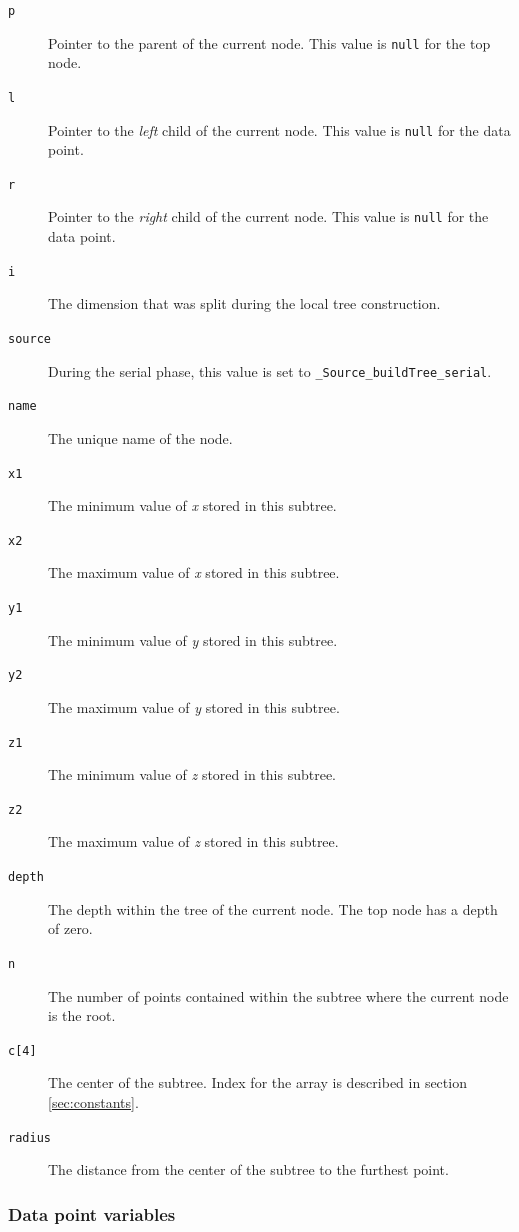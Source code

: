 \documentclass{article}
\begin{document}
\begin{description}
    \item[\texttt{p}]{Pointer to the parent of the current node. This value is \texttt{null} for the top node.}
    \item[\texttt{l}]{Pointer to the \textit{left} child of the current node. This value is \texttt{null} for the data point.}
    \item[\texttt{r}]{Pointer to the \textit{right} child of the current node. This value is \texttt{null} for the data point.}
    \item[\texttt{i}]{The dimension that was split during the local tree construction.}
    \item[\texttt{source}]{During the serial phase, this value is set to \texttt{\_Source\_buildTree\_serial}.}
    \item[\texttt{name}]{The unique name of the node.}
    \item[\texttt{x1}]{The minimum value of \textit{x} stored in this subtree.}
    \item[\texttt{x2}]{The maximum value of \textit{x} stored in this subtree.}
    \item[\texttt{y1}]{The minimum value of \textit{y} stored in this subtree.}
    \item[\texttt{y2}]{The maximum value of \textit{y} stored in this subtree.}
    \item[\texttt{z1}]{The minimum value of \textit{z} stored in this subtree.}
    \item[\texttt{z2}]{The maximum value of \textit{z} stored in this subtree.}
    \item[\texttt{depth}]{The depth within the tree of the current node. The top node has a depth of zero.}
    \item[\texttt{n}]{The number of points contained within the subtree where the current node is the root.}
    \item[\texttt{c[4]}]{The center of the subtree. Index for the array is described in section \ref{sec:constants}.}
    \item[\texttt{radius}]{The distance from the center of the subtree to the furthest point.}
\end{description}


%
%

\subsubsection{Data point variables}
\end{document}
